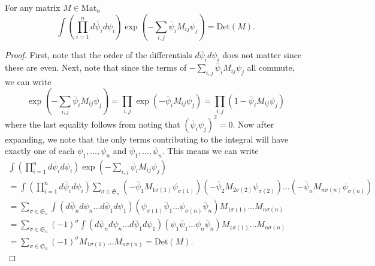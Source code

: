 \documentclass[10pt,a4paper]{amsart}
\newcommand{\Det}{\mathrm{Det}}%
\newcommand{\Mat}{\mathrm{Mat}}%
\begin{document}
\begin{prop} 
For any matrix $M \in \Mat_{n}$
$$
\int 
\left( \prod_{i=1}^{n} d\bar{\psi}_i d{\psi}_i \right) 
\exp\left(- \sum_{i,j} \bar{\psi}_i M_{ij} \psi_j\right)
= 
\Det(M).
$$
\end{prop}

\begin{proof}
First, note that the order of the differentials $d\bar{\psi}_i d{\psi}_i$ does not matter since these are even.  Next, note that since the terms of $-\sum_{i,j} \bar{\psi}_i M_{ij} \psi_j$ all commute, we can write
$$
\exp\left(- \sum_{i,j} \bar{\psi}_i M_{ij} \psi_j\right)
=
\prod_{i,j} \exp( - \bar{\psi}_i M_{ij} \psi_j )
=
\prod_{i,j} ( 1 - \bar{\psi}_i M_{ij} \psi_j )
$$
where the last equality follows from noting that $(\bar{\psi}_i \psi_j )^2 = 0$. Now after expanding, we note that the only terms contributing to the integral will have exactly one of each $\psi_1,\dots,\psi_n$ and $\bar{\psi}_1,\dots,\bar{\psi}_n$. This means we can write 
\begin{gather*}
\int 
\left( \prod_{i=1}^{n} d\bar{\psi}_i d{\psi}_i \right) 
\exp\left(- \sum_{i,j} \bar{\psi}_i M_{ij} \psi_j\right)
\\
= 
\int 
\left( \prod_{i=1}^{n} d\bar{\psi}_i d{\psi}_i \right) 
\sum_{\sigma \in \mathfrak{S}_n}
( - \bar{\psi}_1 M_{1 \sigma(1)} \psi_{\sigma(1)} ) 
( - \bar{\psi}_2 M_{2 \sigma(2)} \psi_{\sigma(2)} ) 
\dots
( - \bar{\psi}_n M_{n \sigma(n)} \psi_{\sigma(n)} )
\\
= 
\sum_{\sigma \in \mathfrak{S}_n} 
\int 
( d\bar{\psi}_n d{\psi}_n \dots  d\bar{\psi}_1 d{\psi}_1 ) 
( \psi_{\sigma(1)} \bar{\psi}_1  \dots \psi_{\sigma(n)} \bar{\psi}_n )
M_{1 \sigma(1)} \dots M_{n \sigma(n)}
\\
= 
\sum_{\sigma \in \mathfrak{S}_n} (-1)^{\sigma}
\int 
( d\bar{\psi}_n d{\psi}_n \dots  d\bar{\psi}_1 d{\psi}_1 ) 
( \psi_{1} \bar{\psi}_1  \dots \psi_{n} \bar{\psi}_n )
M_{1 \sigma(1)} \dots M_{n \sigma(n)}
\\
= 
\sum_{\sigma \in \mathfrak{S}_n} (-1)^{\sigma}
M_{1 \sigma(1)} \dots M_{n \sigma(n)}
= \Det(M).
\end{gather*}
\end{proof}
\end{document}
